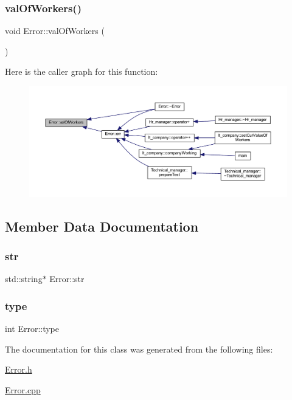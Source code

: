 \subsubsection{\texorpdfstring{val\+Of\+Workers()}{valOfWorkers()}}
{\footnotesize\ttfamily void Error\+::val\+Of\+Workers (\begin{DoxyParamCaption}{ }\end{DoxyParamCaption})}

Here is the caller graph for this function\+:
\nopagebreak
\begin{figure}[H]
\begin{center}
\leavevmode
\includegraphics[width=350pt]{class_error_a5d7c6b97cda36f85a426dd2032c242d3_icgraph}
\end{center}
\end{figure}


\subsection{Member Data Documentation}
\hypertarget{class_error_adef2e029304986e6210e7f81f0dca074}{}\label{class_error_adef2e029304986e6210e7f81f0dca074} 
\subsubsection{\texorpdfstring{str}{str}}
{\footnotesize\ttfamily std\+::string$\ast$ Error\+::str}

\hypertarget{class_error_a87ec3b472513bcf651c0facbd9926c7c}{}\label{class_error_a87ec3b472513bcf651c0facbd9926c7c} 
\subsubsection{\texorpdfstring{type}{type}}
{\footnotesize\ttfamily int Error\+::type}



The documentation for this class was generated from the following files\+:\begin{DoxyCompactItemize}
\item 
\hyperlink{_error_8h}{Error.\+h}\item 
\hyperlink{_error_8cpp}{Error.\+cpp}\end{DoxyCompactItemize}
